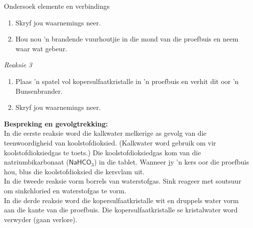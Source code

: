 \begin{g_experiment}{Ondersoek elemente en verbindings}
\begin{enumerate}[label=\textbf{\arabic*}.]
\item Skryf jou waarnemings neer.
\item Hou nou 'n brandende vuurhoutjie in die mond van die proefbuis en neem waar wat gebeur. 
\end{enumerate}
\textsl{Reaksie 3}\\
\begin{enumerate}[label=\textbf{\arabic*}.]
\item Plaas 'n spatel vol kopersulfaatkristalle in 'n proefbuis en verhit dit oor 'n Bunsenbrander.
\item Skryf jou waarnemings neer.
\end{enumerate}
\textbf{Bespreking en gevolgtrekking:}\\
 In die eerste reaksie word die kalkwater melkerige as gevolg van die teenwoordigheid van koolstofdioksied. (Kalkwater word gebruik om vir koolstofdioksiedgas te toets.) Die koolstofdioksiedgas kom van die natriumbikarbonaat ($\textsf{NaHCO}_3$) in die tablet. Wanneer jy  'n kers oor die proefbuis hou, blus die koolstofdioksied die kersvlam uit.\\
In die tweede reaksie vorm borrels van waterstofgas. Sink reageer met soutsuur om sinkchloried en waterstofgas te vorm. \\
In die derde reaksie word die kopersulfaatkristalle wit en druppels water vorm aan die kante van die proefbuis. Die kopersulfaatkristalle se kristalwater word verwyder (gaan verlore).
\end{g_experiment}


